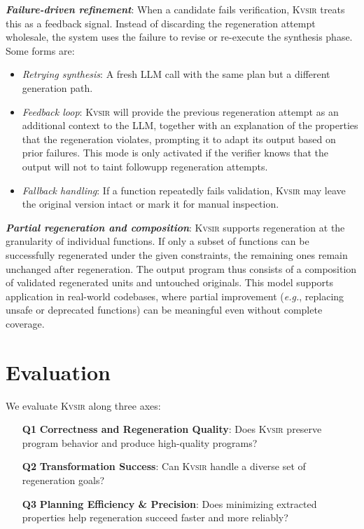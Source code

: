\documentclass[noacm,sigplan]{acmart}
\def\eg{{\em e.g.}, }
\newcommand{\sys}{{\scshape Kv{\textalpha}sir}\xspace}
\newcommand{\heading}[1]{\vspace{2pt}\noindent\textbf{\emph{#1}}:\enspace}
\begin{document}
\heading{Failure-driven refinement}
When a candidate fails verification, \sys treats this as a feedback signal. Instead of discarding the regeneration attempt wholesale, the system uses the failure to revise or re-execute the synthesis phase.
Some forms are:
\begin{itemize}
  \item \emph{Retrying synthesis}: A fresh LLM call with the same plan but a different generation path.
  \item \emph{Feedback loop}: \sys will provide the previous regeneration attempt 
    as an additional context to the LLM, together with an explanation of the properties that the regeneration violates, prompting it to adapt its output based on prior failures.
    This mode is only activated if the verifier knows that the output will not to taint
    followupp regeneration attempts.
  \item \emph{Fallback handling}: If a function repeatedly fails validation, \sys may leave the original version intact or mark it for manual inspection.
\end{itemize}


\heading{Partial regeneration and composition}
\sys supports regeneration at the granularity of individual functions.
If only a subset of functions can be successfully regenerated under the given constraints, the remaining ones remain unchanged after regeneration.
The output program thus consists of a composition of validated regenerated units and untouched originals.
This model supports application in real-world codebases, where partial improvement (\eg replacing unsafe or deprecated functions) can be meaningful even without complete coverage.

\section{Evaluation}
\label{sec:evaluation}

We evaluate \sys along three axes:

\begin{itemize}
  \item[\textbf{Q1}] \textbf{Correctness and Regeneration Quality}: Does \sys preserve program behavior and produce high-quality programs?
  \item[\textbf{Q2}] \textbf{Transformation Success}: Can \sys handle a diverse set of regeneration goals?
  \item[\textbf{Q3}] \textbf{Planning Efficiency \& Precision}: Does minimizing extracted properties help regeneration succeed faster and more reliably?
\end{itemize}
\end{document}
